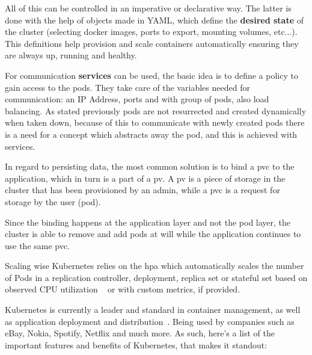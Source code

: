 All of this can be controlled in an imperative or declarative way. The latter is done with the help of objects made in YAML, which define the \textbf{desired state} of the cluster (selecting docker images, ports to export, mounting volumes, etc...). This definitions help provision and scale containers automatically ensuring they are always up, running and healthy.

For communication \textbf{services} can be used, the basic idea is to define a policy to gain access to the pods. They take care of the variables needed for communication: an IP Address, ports and with group of pods, also load balancing. As stated previously pods are not resurrected and created dynamically when taken down, because of this to communicate with newly created pods there is a need for a concept which abstracts away the pod, and this is achieved with services.

In regard to persisting data, the most common solution is to bind a \acrfull{pvc} to the application, which in turn is a part of a \acrfull{pv}. A \acrshort{pv} is a piece of storage in the cluster that has been provisioned by an admin, while a \acrshort{pvc} is a request for storage by the user (pod).

Since the binding happens at the application layer and not the pod layer, the cluster is able to remove and add pods at will while the application continues to use the same \acrshort{pvc}. 

Scaling wise Kubernetes relies on the \acrfull{hpa} which automatically scales the number of Pods in a replication controller, deployment, replica set or stateful set based on observed CPU utilization ~\cite{horizontal-pod-autoscaler-definition} or with custom metrics, if provided.


Kubernetes is currently a leader and standard in container management, as well as application deployment and distribution~\cite{kubernetes-vs-docker, kubernetes-leader}. Being used by companies such as eBay, Nokia, Spotify, Netflix and much more. As such, here's a list of the important features and benefits of Kubernetes, that makes it standout:


